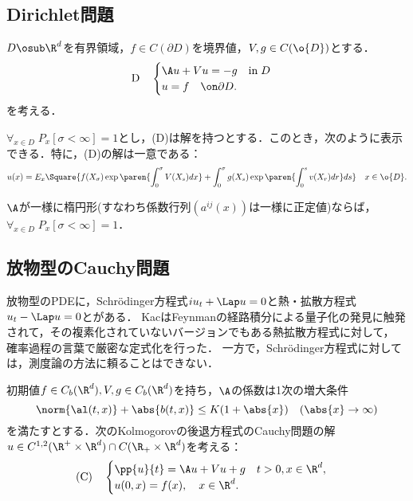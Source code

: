 \documentclass[uplatex,dvipdfmx]{jsreport}
\begin{document}
\subsection{Dirichlet問題}

\begin{problem}
    $D\osub\R^d$を有界領域，$f\in C(\partial D)$を境界値，$V,g\in C(\o{D})$とする．
    \[\mathrm{D}\quad\begin{cases}
        \A u+Vu=-g\quad\mathrm{in}\;D\\
        u=f\quad\on\partial D.
    \end{cases}\]
    を考える．
\end{problem}

\begin{theorem}
    $\forall_{x\in D}\;P_x[\sigma<\infty]=1$とし，(D)は解を持つとする．このとき，次のように表示できる．特に，(D)の解は一意である：
    \[u(x)=E_x\Square{f(X_\sigma)\exp\paren{\int^\sigma_0V(X_s)dx}+\int^\sigma_0g(X_s)\exp\paren{\int^s_0v(X_r)dr}ds}\quad x\in\o{D}.\]
\end{theorem}

\begin{proposition}
    $\A$が一様に楕円形(すなわち係数行列$(a^{ij}(x))$は一様に正定値)ならば，$\forall_{x\in D}\;P_x[\sigma<\infty]=1$．
\end{proposition}

\subsection{放物型のCauchy問題}

\begin{tcolorbox}[colframe=ForestGreen, colback=ForestGreen!10!white,breakable,colbacktitle=ForestGreen!40!white,coltitle=black,fonttitle=\bfseries\sffamily,
title=]
    放物型のPDEに，Schrödinger方程式$iu_t+\Lap u=0$と熱・拡散方程式$u_t-\Lap u=0$とがある．
    KacはFeynmanの経路積分による量子化の発見に触発されて，その複素化されていないバージョンでもある熱拡散方程式に対して，
    確率過程の言葉で厳密な定式化を行った．
    一方で，Schrödinger方程式に対しては，測度論の方法に頼ることはできない．
\end{tcolorbox}

\begin{problem}[Kolmogorovの後退方程式に関するCauchy問題]
    初期値$f\in C_b(\R^d),V,g\in C_b(\R^d)$を持ち，$\A$の係数は1次の増大条件
    \[\norm{\al(t,x)}+\abs{b(t,x)}\le K(1+\abs{x})\quad(\abs{x}\to\infty)\]
    を満たすとする．次のKolmogorovの後退方程式のCauchy問題の解$u\in C^{1,2}(\R^+\times\R^d)\cap C(\R_+\times\R^d)$を考える：
    \[\mathrm{(C)}\quad\begin{cases}
        \pp{u}{t}=\A u+Vu+g\quad t>0,x\in\R^d,\\
        u(0,x)=f(x),\quad x\in\R^d.
    \end{cases}\]
\end{problem}
\end{document}
